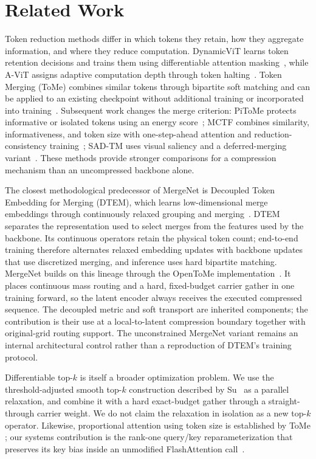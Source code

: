 \section{Related Work}
\label{sec:related-work}

Token reduction methods differ in which tokens they retain, how they aggregate
information, and where they reduce computation. DynamicViT learns token
retention decisions and trains them using differentiable attention
masking~\cite{dynamicvit2021}, while A-ViT assigns adaptive computation depth
through token halting~\cite{avit2022}. Token Merging (ToMe) combines similar
tokens through bipartite soft matching and can be applied to an existing
checkpoint without additional training or incorporated into
training~\cite{tome2023}. Subsequent work changes the merge criterion:
PiToMe protects informative or isolated tokens using an energy
score~\cite{pitome2024}; MCTF combines similarity, informativeness, and token
size with one-step-ahead attention and reduction-consistency
training~\cite{mctf2024}; SAD-TM uses visual saliency and a deferred-merging
variant~\cite{sadtm2026}. These methods provide stronger comparisons for a
compression mechanism than an uncompressed backbone alone.

The closest methodological predecessor of MergeNet is Decoupled Token
Embedding for Merging (DTEM), which learns low-dimensional merge embeddings
through continuously relaxed grouping and merging~\cite{dtem2024}. DTEM
separates the representation used to select merges from the features used by
the backbone. Its continuous operators retain the physical token count;
end-to-end training therefore alternates relaxed embedding updates with
backbone updates that use discretized merging, and inference uses hard
bipartite matching. MergeNet builds on this lineage through the OpenToMe
implementation~\cite{opentome}. It places continuous mass routing and a hard,
fixed-budget carrier gather in one training forward, so the latent encoder
always receives the executed compressed sequence. The decoupled metric and
soft transport are inherited components; the contribution is their use at a
local-to-latent compression boundary together with original-grid routing
support. The unconstrained MergeNet variant remains an internal architectural
control rather than a reproduction of DTEM's training protocol.

Differentiable top-$k$ is itself a broader optimization problem. We use the
threshold-adjusted smooth top-$k$ construction described by
Su~\cite{sujianlin2024topk} as a parallel relaxation, and combine it with a
hard exact-budget gather through a straight-through carrier weight. We do not
claim the relaxation in isolation as a new top-$k$ operator. Likewise,
proportional attention using token size is established by ToMe
\cite{tome2023}; our systems contribution is the rank-one query/key
reparameterization that preserves its key bias inside an unmodified
FlashAttention call~\cite{flashattn2022}.

